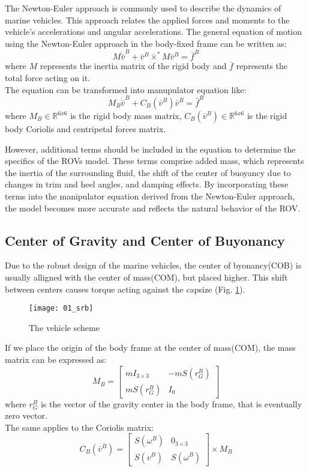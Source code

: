    The Newton-Euler approach is commonly used to describe the dynamics of marine vehicles.
    This approach relates the applied forces and moments to the vehicle's accelerations and angular accelerations.
    The general equation of motion using the Newton-Euler approach in the body-fixed frame can be written as:
    $$
    M\dot{\bar{v}}^B+\bar{v}^B\bar{\times}^*M\bar{v}^B=\bar{f}^B
    $$
    where $M$ represents the inertia matrix of the rigid body and 
    $\bar{f}$ represents the total force acting on it.\\
    The equation can be transformed into manupulator equation like:
    $$
     M_B \dot{\bar{v}}^B+C_B(\bar{v}^B) \bar{v}^B
    = \bar{f}^B
    $$
    where
    $M_B \in \mathbb{R}^{6 x 6}$ is the rigid body mass matrix,
    $C_B(\bar{v}^B) \in \mathbb{R}^{6 x 6}$ is the rigid body Coriolis and centripetal forces matrix.

    However, additional terms should be included in the equation to determine the specifics of the ROVs model. 
    These terms comprise added mass, which represents the inertia of the surrounding fluid, the shift of the 
    center of buoyancy due to changes in trim and heel angles, and damping effects. 
    By incorporating these terms into the manipulator equation derived from the Newton-Euler approach, 
    the model becomes more accurate and reflects the natural behavior of the ROV.    

\subsection{Center of Gravity and Center of Buyonancy}
    
    Due to the robust design of the marine vehicles, the center of byonancy(COB) is usually alligned with
    the center of mass(COM), but placed higher.
    This shift between centers causes torque acting against the capsize (Fig. \ref{image:scheme}).\\
    \begin{figure}[H]
        \centering\texttt{[image: 01\_srb]}
        \caption{The vehicle scheme}
        \label{image:scheme}
    \end{figure}
    
    If we place the origin of the body frame at the center of mass(COM), the mass matrix can be expressed as:\\
    $$
    M_B=\left[\begin{array}{cc}
        m I_{3 \times 3} & -m S\left(r_G^B\right) \\
        m S\left(r_G^B\right) & I_0
    \end{array}\right]
    $$
    where $r_G^B$ is the vector of the gravity center in the body frame, that is eventually zero vector.\\
    The same applies to the Coriolis matrix:
    $$
    C_B(\bar{v}^B) =\left[\begin{array}{cc}
        S(\omega^B) & 0_{3 \times 3} \\
        S(v^B) & S(\omega^B)
    \end{array}\right]\times M_B
    $$
